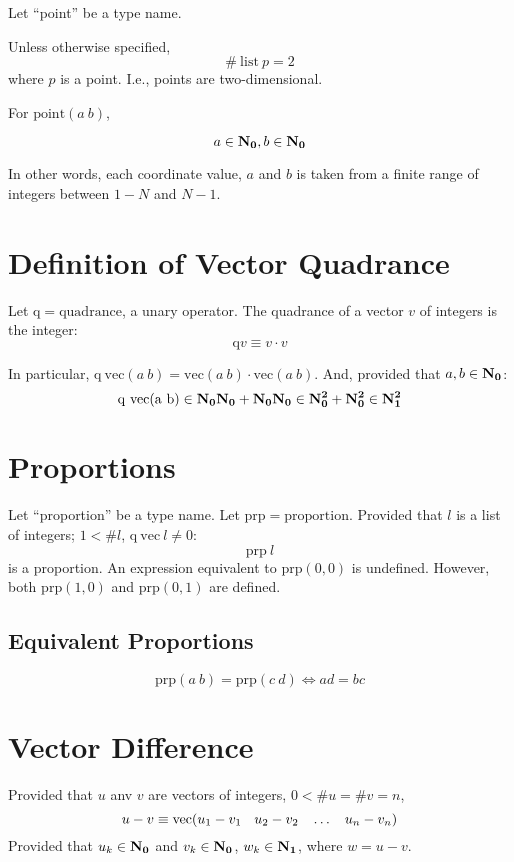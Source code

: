 \documentclass{article}
\begin{document}
Let ``point'' be a type name.

Unless otherwise specified,
$$\#\ \mathrm{list}\ p = 2$$
where $p$ is a point. I.e., points are two-dimensional.

For $\mathrm{point}(a\ b)$,

$$a\in \mathbf{N_0}, b\in \mathbf{N_0}$$

\noindent
In other words, each coordinate value,
$a$ and $b$ is taken from a finite range of integers between
$1-N$ and $N-1$.

\section{Definition of Vector Quadrance}

Let $\mathrm{q} = \mathrm{quadrance}$, a unary operator.
The quadrance of a vector $v$ of integers is the integer:
$$\mathrm{q}v\equiv v\cdot v$$

\noindent
In particular,
$\mathrm{q}\ \mathrm{vec}(a\ b)=
\mathrm{vec}(a\ b)\cdot
\mathrm{vec}(a\ b)$.
And, provided that $a, b\in\mathbf{N_0}$:
$$\mathrm{q\ vec(a\ b)}\in \mathbf{N_0}\mathbf{N_0}+\mathbf{N_0}\mathbf{N_0}\in \mathbf{N_0^2}+\mathbf{N_0^2}\in \mathbf{N_1^2}$$

\section{Proportions}

Let ``proportion'' be a type name.
Let $\mathrm{prp} = \mathrm{proportion}$.
Provided that $l$ is a list of integers;
$1<\#l$,
$\mathrm{q\ vec}\ l \ne 0$:
$$\mathrm{prp}\ l$$
is a proportion.
An expression equivalent to $\mathrm{prp}(0, 0)$ is undefined.
However, both
$\mathrm{prp}(1, 0)$ and $\mathrm{prp}(0, 1)$
are defined.

\subsection{Equivalent Proportions}

$$\mathrm{prp}(a\ b) = \mathrm{prp}(c\ d) \Leftrightarrow ad = bc$$

\section{Vector Difference}

Provided that $u$ anv $v$ are vectors of integers, $0<\#u=\#v=n$,
$$u-v\equiv \mathrm{vec}(u_1 - v_1\en u_2 - v_2\en \ldots\en u_n - v_n)$$
Provided that $u_k\in\mathbf{N_0}$ and $v_k\in\mathbf{N_0}$,
$w_k\in\mathbf{N_1}$,
where $w=u-v$.
\end{document}
